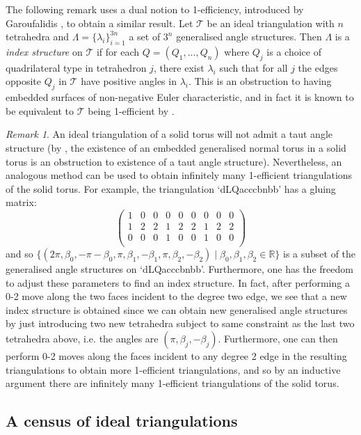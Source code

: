\documentclass[12pt,reqno]{amsart}  %
\theoremstyle{definition}
\theoremstyle{remark}
\newtheorem{rmk}[thm]{Remark}
\def\R{\mathbb{R}}
\newcommand{\T}{\mathcal{T}}
\begin{document}
The following remark uses a dual notion to 1-efficiency, introduced by 
Garoufalidis \cite{Gar}, to obtain a similar result. Let $\T$ be an ideal 
triangulation with $n$ tetrahedra and $\Lambda=\{\lambda_i\}_{i=1}^{3n}$ a 
set of $3^n$ generalised angle structures. Then $\Lambda$ is a 
\emph{index structure} on $\T$ if for each $Q=(Q_1, ..., Q_n)$ where $Q_j$ 
is a choice of quadrilateral type in tetrahedron $j$,  there exist 
$\lambda_i$ such that for all $j$ the edges opposite $Q_j$ in $\T$ have 
positive angles in $\lambda_i$. This is an obstruction to having embedded 
surfaces of non-negative Euler characteristic, and in fact it is known to 
be equivalent to $\T$ being 1-efficient by \cite[Theorem 1.2]{GHRS}. 

\begin{rmk}
An ideal triangulation of a solid torus will not admit a taut angle 
structure (by \cite{KR2}, the existence of an embedded generalised 
normal torus in a solid torus is an obstruction to existence of a taut 
angle structure). Nevertheless, an analogous method can be used to 
obtain infinitely many 1-efficient triangulations of the solid torus. For 
example, the triangulation `dLQacccbnbb' has a gluing matrix: 
$$
\begin{pmatrix} 
1& 0& 0& 0& 0& 0& 0& 0& 0\\
1& 2& 2& 1& 2& 2& 1& 2& 2\\
0& 0& 0& 1& 0& 0& 1& 0& 0\\
\end{pmatrix}
$$
and so $\{(2\pi, \beta_0, -\pi- \beta_0, \pi, \beta_1, 
-\beta_1, \pi, \beta_2, -\beta_2)\mid \beta_0,\beta_1,\beta_2\in \R \}$ 
is a subset of the generalised angle structures on `dLQacccbnbb'. 
Furthermore, one has the freedom to adjust these parameters to find an 
index structure. In fact, after performing a 0-2 move along the two faces 
incident to the degree two edge, we see that a new index structure is 
obtained since we can obtain new generalised angle structures by just 
introducing two new tetrahedra subject to same constraint as the last two 
tetrahedra above, i.e. the angles are $(\pi, \beta_j, -\beta_j)$. 
Furthermore, one can then perform 0-2 moves along the faces incident to 
any degree 2 edge in the resulting triangulations to obtain more 
1-efficient triangulations, and so by an inductive argument there are 
infinitely many 1-efficient triangulations of the solid torus.
\end{rmk}

\subsection{A census of ideal triangulations}
\end{document}
